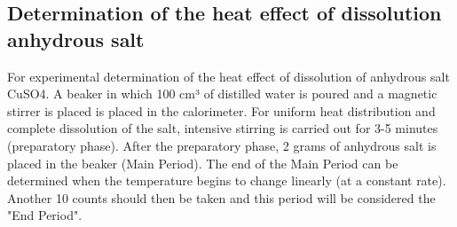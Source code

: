 \documentclass[12pt, letterpaper]{article}
\begin{document}
        \subsection*{Determination of the heat effect of dissolution
anhydrous salt}
        \hspace{4mm} For experimental determination of the heat effect of dissolution of anhydrous salt CuSO4. A beaker in which 100 cm³ of distilled water is poured and a magnetic stirrer is placed is placed in the calorimeter. For uniform heat distribution and complete dissolution of the salt, intensive stirring is carried out for 3-5 minutes (preparatory phase). After the preparatory phase, 2 grams of anhydrous salt is placed in the beaker (Main Period). The end of the Main Period can be determined when the temperature begins to change linearly (at a constant rate). Another 10 counts should then be taken and this period will be considered the "End Period".
\end{document}
